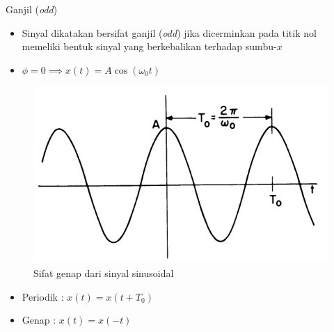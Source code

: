 \documentclass[aspectratio=169]{beamer}
\begin{document}
\begin{frame}{Ganjil (\textit{odd})}
	\begin{itemize}
		\item Sinyal dikatakan bersifat ganjil (\textit{odd}) jika dicerminkan pada titik nol memeliki bentuk sinyal yang berkebalikan terhadap sumbu-$ x $
		\item $ \phi = 0 \implies x(t) = A \cos(\omega_0 t) $	
	\end{itemize}
	\begin{figure}
		\centering
		\includegraphics[height=0.35\textheight]{gambar/01.sinyal_genap}
		\caption{Sifat genap dari sinyal sinusoidal}
	\end{figure}
	\begin{itemize}
		\item Periodik : $ x(t) = x(t + T_0) $
		\item Genap : $ x(t) = x(-t) $
	\end{itemize}
\end{frame}
\end{document}
